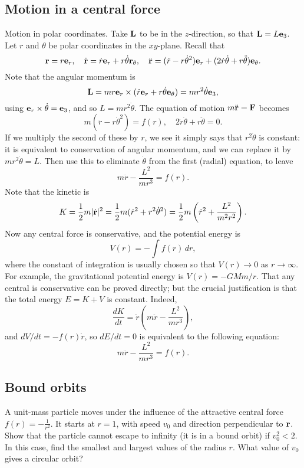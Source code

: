 \documentclass[10pt, a4paper]{article}
\begin{document}
\subsection{Motion in a central force}
Motion in polar coordinates.
Take $\mathbf{L}$ to be in the $z$-direction,
so that $\mathbf{L} = L\mathbf{e}_3$.
Let $r$ and $\theta$ be polar coordinates in the $xy$-plane.
Recall that
\[
\mathbf{r} = r\mathbf{e}_r,\quad\dot{\mathbf{r}} = \dot{r}\mathbf{e}_r + r\dot{\theta}\mathbf{r}_{\theta},\quad\ddot{\mathbf{r}} = (\ddot{r} - r\dot{\theta} ^ 2)\mathbf{e}_r + (2\dot{r}\dot{\theta} + r\ddot{\theta})\mathbf{e}_{\theta}.
\]
Note that the angular momentum is
\[
\mathbf{L} = mr\mathbf{e}_r \times (\dot{r}\mathbf{e}_r + r\dot{\theta}\mathbf{e}_{\theta}) = mr ^ 2\dot{\theta}\mathbf{e}_3,
\]
using $\mathbf{e}_r \times \dot{\theta} = \mathbf{e}_3$,
and so  $L = mr ^ 2\dot{\theta}$.
The equation of motion $m\ddot{\mathbf{r}} = \mathbf{F}$ becomes
\[
m(\ddot{r} - r\dot{\theta} ^ 2) = f(r),\quad 2\dot{r}\dot{\theta} + r\ddot{\theta} = 0.
\]
If we multiply the second of these by $r$,
we see it simply says that $r ^ 2\dot{\theta}$ is constant:
it is equivalent to conservation of angular momentum,
and we can replace it by $mr ^ 2\dot{\theta} = L$.
Then use this to eliminate $\dot{\theta}$ from the first
(radial)
equation,
to leave
\[
m\ddot{r} - \frac{L ^ 2}{mr ^ 3} = f(r).
\]
Note that the kinetic is
\[
K = \frac{1}{2}m|\dot{\mathbf{r}}| ^ 2 = \frac{1}{2}m(\dot{r} ^ 2 + r ^ 2\dot{\theta} ^ 2) = \frac{1}{2}m\left(\dot{r} ^ 2 + \frac{L ^ 2}{m ^ 2r ^ 2}\right).
\]
Now any central force is conservative,
and the potential energy is
\[
V(r) = -\int f(r)\,dr,
\]
where the constant of integration is usually chosen so that $V(r) \rightarrow 0$ as $r \rightarrow \infty$.
For example,
the gravitational potential energy is $V(r) = -GMm / r$.
That any central is conservative can be proved directly;
but the crucial justification is that the total energy $E = K + V$ is constant.
Indeed,
\[
\frac{dK}{dt} = \dot{r}\left(m\ddot{r} - \frac{L ^ 2}{mr ^ 3}\right),
\]
and $dV / dt = -f(r)\dot{r}$,
so $dE / dt = 0$ is equivalent to the following equation:
\[
m\ddot{r} - \frac{L ^ 2}{mr ^ 3} = f(r).
\]

\subsection{Bound orbits}

A unit-mass particle moves under the influence of the attractive central force $f(r) = -\frac{1}{r ^ 2}$.
It starts at $r = 1$,
with speed $v_0$ and direction perpendicular to $\mathbf{r}$.
Show that the particle cannot escape to infinity
(it is in a bound orbit)
if $v_0 ^ 2 < 2$.
In this case,
find the smallest and largest values of the radius $r$.
What value of $v_0$ gives a circular orbit?
\end{document}
